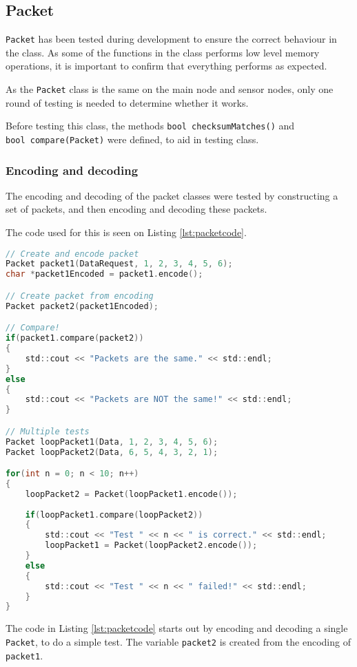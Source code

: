 \subsection{Packet}
\texttt{Packet} has been tested during development to ensure the correct behaviour in the class. As some of the functions in the class performs low level memory operations, it is important to confirm that everything performs as expected.

As the \texttt{Packet} class is the same on the main node and sensor nodes, only one round of testing is needed to determine whether it works.

Before testing this class, the methods \texttt{bool checksumMatches()} and \\ \texttt{bool compare(Packet)} were defined, to aid in testing class.

\subsubsection*{Encoding and decoding}
The encoding and decoding of the packet classes were tested by constructing a set of packets, and then encoding and decoding these packets.


The code used for this is seen on Listing \ref{lst:packetcode}.

\begin{lstlisting}[language=C,label={lst:packetcode},caption={Testing packet encoding/decoding}]
// Create and encode packet
Packet packet1(DataRequest, 1, 2, 3, 4, 5, 6);
char *packet1Encoded = packet1.encode();

// Create packet from encoding
Packet packet2(packet1Encoded);

// Compare!
if(packet1.compare(packet2))
{
    std::cout << "Packets are the same." << std::endl;
}
else
{
    std::cout << "Packets are NOT the same!" << std::endl;
}

// Multiple tests
Packet loopPacket1(Data, 1, 2, 3, 4, 5, 6);
Packet loopPacket2(Data, 6, 5, 4, 3, 2, 1);

for(int n = 0; n < 10; n++)
{
    loopPacket2 = Packet(loopPacket1.encode());
    
    if(loopPacket1.compare(loopPacket2))
    {
        std::cout << "Test " << n << " is correct." << std::endl;
        loopPacket1 = Packet(loopPacket2.encode());
    }
    else
    {
        std::cout << "Test " << n << " failed!" << std::endl;
    }
}
\end{lstlisting}
The code in Listing \ref{lst:packetcode} starts out by encoding and decoding a single \texttt{Packet}, to do a simple test. The variable \texttt{packet2} is created from the encoding of \texttt{packet1}. 


